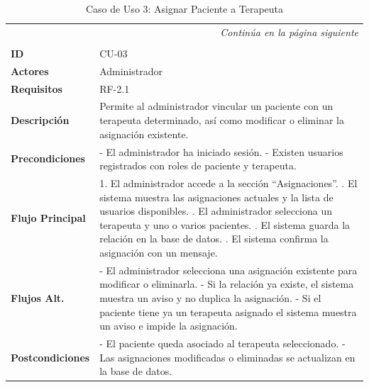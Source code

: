 \clearpage
\begin{longtable}{p{} p{}}
    \toprule
    \endfirsthead
    \toprule
    \endhead
    \midrule
    \multicolumn{2}{r}{\small\itshape Continúa en la página siguiente} \\
    \endfoot
    \bottomrule
    \noalign{\vspace{0.5cm}}
    \caption{Caso de Uso 3: Asignar Paciente a Terapeuta} \label{cu:3} \\
    \endlastfoot

    \textbf{ID} & CU-03 \\ \midrule
    \textbf{Actores} & Administrador \\ \midrule
    \textbf{Requisitos} & RF-2.1 \\ \midrule
    \textbf{Descripción} & Permite al administrador vincular un paciente con un terapeuta determinado, así como modificar o eliminar la asignación existente. \\ \midrule
    \textbf{Precondiciones} & 
    - El administrador ha iniciado sesión. \newline
    - Existen usuarios registrados con roles de paciente y terapeuta. \\ \midrule
    \textbf{Flujo Principal} & 
    1. El administrador accede a la sección “Asignaciones”. \newline
    2. El sistema muestra las asignaciones actuales y la lista de usuarios disponibles. \newline
    3. El administrador selecciona un terapeuta y uno o varios pacientes. \newline
    4. El sistema guarda la relación en la base de datos. \newline
    5. El sistema confirma la asignación con un mensaje. \\ \midrule
    \textbf{Flujos Alt.} & 
    - El administrador selecciona una asignación existente para modificar o eliminarla. \newline
    - Si la relación ya existe, el sistema muestra un aviso y no duplica la asignación. \newline
    - Si el paciente tiene ya un terapeuta asignado el sistema muestra un aviso e impide la asignación. \\ \midrule
    \textbf{Postcondiciones} & 
    - El paciente queda asociado al terapeuta seleccionado. \newline
    - Las asignaciones modificadas o eliminadas se actualizan en la base de datos. \\
\end{longtable}

